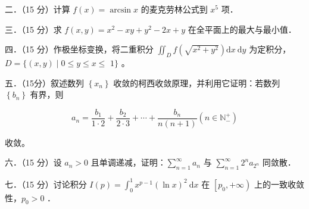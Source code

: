 \documentclass{article}
\begin{document}
二．（15 分）计算 \(f(x)=\arcsin x\) 的麦克劳林公式到 \(x^{5}\) 项．

三．（15 分）求 \(f(x, y)=x^{2}-x y+y^{2}-2 x+y\) 在全平面上的最大与最小值．

四．（15 分）作极坐标变换，将二重积分 \(\iint_{D} f\left(\sqrt{x^{2}+y^{2}}\right) \mathrm{d} x \mathrm{~d} y\) 为定积分，\(D=\{(x, y) \mid 0 \leq y \leq x \leq\) \(1\}\) 。

五．（15分）叙述数列 \(\left\{x_{n}\right\}\) 收敛的柯西收敛原理，并利用它证明：若数列 \(\left\{b_{n}\right\}\) 有界，则

\[
a_{n}=\frac{b_{1}}{1 \cdot 2}+\frac{b_{2}}{2 \cdot 3}+\cdots+\frac{b_{n}}{n(n+1)}\left(n \in \mathbb{N}_{-}^{+}\right)
\]

收敛。

六．（15 分）设 \(a_{n}>0\) 且单调递减，证明：\(\sum_{n=1}^{\infty} a_{n}\) 与 \(\sum_{n=1}^{\infty} 2^{n} a_{2^{n}}\) 同敛散．

七．（15 分）讨论积分 \(I(p)=\int_{0}^{1} x^{p-1}(\ln x)^{2} \mathrm{~d} x\) 在 \(\left[p_{0},+\infty\right)\) 上的一致收敛性，\(p_{0}>0\) ．
\end{document}
